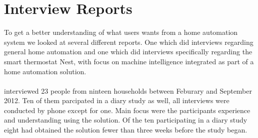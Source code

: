 \section{Interview Reports}
To get a better understanding of what users wants from a home automation system we looked at several different reports. One \cite{HAInterviews} which did interviews regarding general home automation and one which did interviews specifically regarding the smart thermostat Nest\cite{AdaptiveInterviews}, with focus on machine intelligence integrated as part of a home automation solution. 
\\\\
\citep{AdaptiveInterviews} interviewed 23 people from ninteen households between Feburary and September 2012. Ten of them parcipated in a diary study as well, all interviews were conducted by phone except for one. Main focus were the participants experience and understanding using the solution. Of the ten participating in a diary study eight had obtained the solution fewer than three weeks before the study began. 
